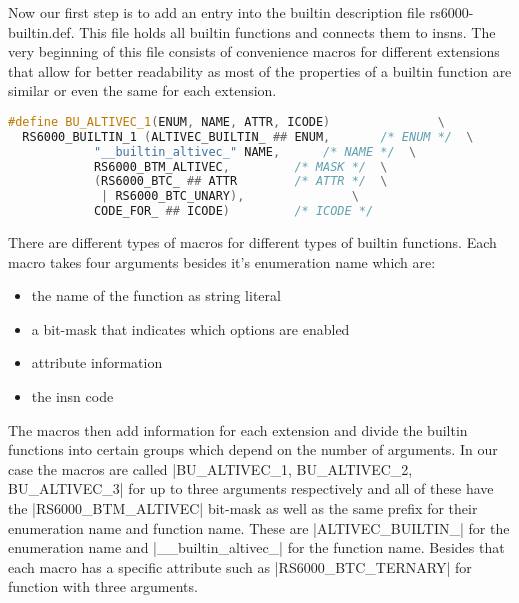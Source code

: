 Now our first step is to add an entry into the builtin description file rs6000-builtin.def. This file holds all builtin functions and connects them to insns. The very beginning of this file consists of convenience macros for different extensions that allow for better readability as most of the properties of a builtin function are similar or even the same for each extension.
\begin{lstlisting}[language=C++,basicstyle=\ttfamily\scriptsize,keywordstyle=\color{red}]
#define BU_ALTIVEC_1(ENUM, NAME, ATTR, ICODE)				\
  RS6000_BUILTIN_1 (ALTIVEC_BUILTIN_ ## ENUM,		/* ENUM */	\
  		    "__builtin_altivec_" NAME,		/* NAME */	\
  		    RS6000_BTM_ALTIVEC,			/* MASK */	\
  		    (RS6000_BTC_ ## ATTR		/* ATTR */	\
   		     | RS6000_BTC_UNARY),				\
  		    CODE_FOR_ ## ICODE)			/* ICODE */
\end{lstlisting}
There are different types of macros for different types of builtin functions. Each macro takes four arguments besides it's enumeration name which are:
\begin{itemize}
	\item the name of the function as string literal
	\item a bit-mask that indicates which options are enabled
	\item attribute information
	\item the insn code
\end{itemize}
The macros then add information for each extension and divide the builtin functions into certain groups which depend on the number of arguments. In our case the macros are called |BU_ALTIVEC_1, BU_ALTIVEC_2, BU_ALTIVEC_3| for up to three arguments respectively and all of these have the |RS6000_BTM_ALTIVEC| bit-mask as well as the same prefix for their enumeration name and function name. These are |ALTIVEC_BUILTIN_| for the enumeration name and |__builtin_altivec_| for the function name. Besides that each macro has a specific attribute such as |RS6000_BTC_TERNARY| for function with three arguments.

